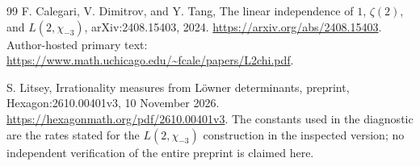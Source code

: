 \documentclass[11pt,a4paper]{article}
\theoremstyle{definition}
\theoremstyle{remark}
\begin{document}
\begin{thebibliography}{99}
F. Calegari, V. Dimitrov, and Y. Tang,
The linear independence of $1$, $\zeta(2)$, and $L(2,\chi_{-3})$,
arXiv:2408.15403, 2024.
\url{https://arxiv.org/abs/2408.15403}.
Author-hosted primary text:
\url{https://www.math.uchicago.edu/~fcale/papers/L2chi.pdf}.

S. Litsey,
Irrationality measures from L\"owner determinants,
preprint, Hexagon:2610.00401v3, 10 November 2026.
\url{https://hexagonmath.org/pdf/2610.00401v3}.
The constants used in the diagnostic are the rates stated for the
$L(2,\chi_{-3})$ construction in the inspected version; no independent
verification of the entire preprint is claimed here.


\end{thebibliography}
\end{document}
